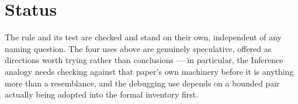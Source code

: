\documentclass[11pt]{article}
\begin{document}
\section{Status}

The rule and its test are checked and stand on their own,
independent of any naming question. The four uses above are
genuinely speculative, offered as directions worth trying rather
than conclusions --- in particular, the Inference analogy needs
checking against that paper's own machinery before it is anything
more than a resemblance, and the debugging use depends on a bounded
pair actually being adopted into the formal inventory first.
\end{document}
